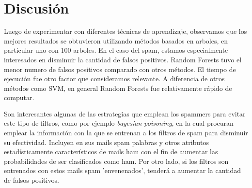 \documentclass[10pt,a4paper]{article}
\begin{document}
\pagebreak

\section{Discusión}

Luego de experimentar con diferentes técnicas de aprendizaje, observamos que los mejores resultados se obtuvieron utilizando métodos basados en arboles, en particular uno con 100 arboles. En el caso del spam, estamos especialmente interesados en disminuir la cantidad de falsos positivos. Random Forests tuvo el menor numero de falsos positivos comparado con otros métodos. El tiempo de ejecución fue otro factor que consideramos relevante. A diferencia de otros métodos como SVM, en general Random Forests fue relativamente rápido de computar.

Son interesantes algunas de las estrategias que emplean los spammers para evitar este tipo de filtros, como por ejemplo \emph{bayesian poisoning}, en la cual procuran emplear la información con la que se entrenan a los filtros de spam para disminuir su efectividad. Incluyen en sus mails spam palabras y otros atributos estadísticamente característicos de mails ham con el fin de aumentar las probabilidades de ser clasificados como ham. Por otro lado, si los filtros son entrenados con estos mails spam 'envenenados', tenderá a aumentar la cantidad de falsos positivos.

%
%
%
%
%

\end{document}
